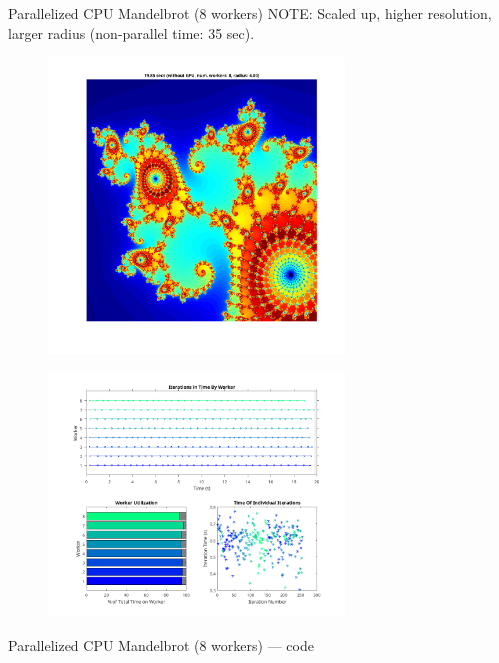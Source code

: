 \documentclass[pdflatex,colorlinks,landscape]{beamer}
\begin{document}
\begin{frame}[allowframebreaks]{Parallelized CPU Mandelbrot (8 workers)}
  NOTE: Scaled up, higher resolution, larger radius (non-parallel time: 35 sec).
  \begin{figure}[H]
    \includegraphics[width=0.7\textwidth]{ParallelMandelbrot.png}
  \end{figure}
  \begin{figure}
    \includegraphics[width=0.7\textwidth]{ParallelMetrics.png}
  \end{figure}
\end{frame}

\begin{frame}[allowframebreaks]{Parallelized CPU Mandelbrot (8 workers) --- code}
  \begin{tiny}
    
  \end{tiny}
  \begin{tiny}
    
  \end{tiny}
\end{frame}
\end{document}

